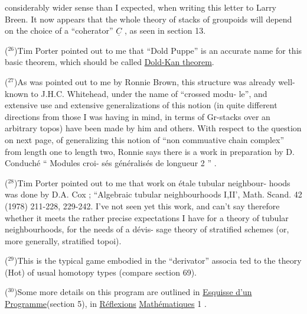 
 considerably wider sense than I expected,  when writing this letter to
Larry Breen.  It now appears that the whole theory of stacks of groupoids
will depend on the choice of a ``coherator'' $\underline{C}$ , as seen in section 13.

($^{26}$)\quad Tim Porter pointed out to me that ``Dold Puppe'' is an accurate name
for this basic theorem,  which should be called \uline{Dold-Kan theorem}.

($^{27}$)\quad As was pointed out to me by Ronnie Brown,  this structure was
already well-known to J.H.C. Whitehead,  under the name of ``crossed modu-%
le'',  and extensive use and extensive generalizations of this notion
(in quite different directions from those I was having in mind,  in
terms of Gr-stacks over an arbitrary topos) have been made by him and
others.  With respect to the question on next page,  of generalizing this
notion of ``non commuative chain complex'' from length one to length two,
Ronnie says there is a work in preparation by D. Conduché `` Modules croi-%
sés généralisés de longueur 2 '' .

($^{28}$)\quad Tim Porter pointed out to me that work on étale tubular neighbour-%
hoods was done by D.A. Cox ; ``Algebraic tubular neighbourhoods I,II',
Math. Scand. 42 (1978)  211-228, 229-242.  I've not seen yet this work,
and can't say therefore whether it meets the rather precise expectations
I have for a theory of tubular neighbourhoods,  for the needs of a dévis-%
sage theory of stratified schemes (or, more generally, stratified topoi).

($^{29}$)\quad This is the typical game  embodied in the ``derivator'' associa%
\hand{-}ted to the theory (Hot) of usual homotopy types (compare section 69).

($^{30}$)\quad Some more details on this program are outlined in \uline{Esquisse d'un
Programme}(section 5),  in \uline{Réflexions} \uline{Mathématiques} 1 .

